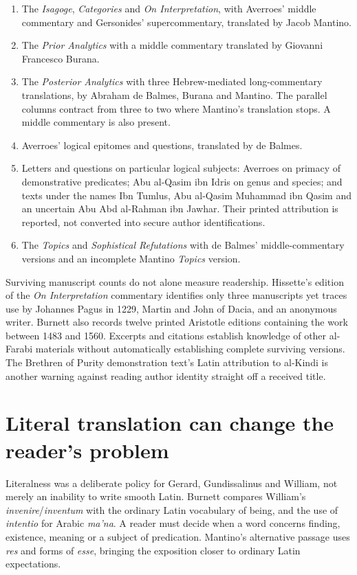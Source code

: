 \begin{enumerate}
\item The \emph{Isagoge}, \emph{Categories} and \emph{On
Interpretation}, with Averroes' middle commentary and
Gersonides' supercommentary, translated by Jacob Mantino.
\item The \emph{Prior Analytics} with a middle commentary
translated by Giovanni Francesco Burana.
\item The \emph{Posterior Analytics} with three Hebrew-mediated
long-commentary translations, by Abraham de Balmes, Burana
and Mantino. The parallel columns contract from three to two
where Mantino's translation stops. A middle commentary is also present.
\item Averroes' logical epitomes and questions, translated by de Balmes.
\item Letters and questions on particular logical subjects:
Averroes on primacy of demonstrative predicates; Abu al-Qasim
ibn Idris on genus and species; and texts under the names
Ibn Tumlus, Abu al-Qasim Muhammad ibn Qasim and an uncertain
Abu Abd al-Rahman ibn Jawhar. Their printed attribution is
reported, not converted into secure author identifications.
\item The \emph{Topics} and \emph{Sophistical Refutations}
with de Balmes' middle-commentary versions and an incomplete
Mantino \emph{Topics} version.
\end{enumerate}

Surviving manuscript counts do not alone measure readership.
Hissette's edition of the \emph{On Interpretation} commentary
identifies only three manuscripts yet traces use by Johannes
Pagus in 1229, Martin and John of Dacia, and an anonymous
writer. Burnett also records twelve printed Aristotle editions
containing the work between 1483 and 1560. Excerpts and
citations establish knowledge of other al-Farabi materials
without automatically establishing complete surviving versions.
The Brethren of Purity demonstration text's Latin attribution
to al-Kindi is another warning against reading author identity
straight off a received title.
\cite[pp.~600--601, notes~11--13]{Burnett2004ArabicLatinHHL}

\section{Literal translation can change the reader's problem}
\label{sec:p13-burnett-2004-calques}

Literalness was a deliberate policy for Gerard, Gundissalinus
and William, not merely an inability to write smooth Latin.
Burnett compares William's \emph{invenire}/\emph{inventum}
with the ordinary Latin vocabulary of being, and the use of
\emph{intentio} for Arabic \emph{ma'na}. A reader must decide
when a word concerns finding, existence, meaning or a subject
of predication. Mantino's alternative passage uses \emph{res}
and forms of \emph{esse}, bringing the exposition closer to
ordinary Latin expectations.
\cite[pp.~601--602, notes~14--15]{Burnett2004ArabicLatinHHL}

